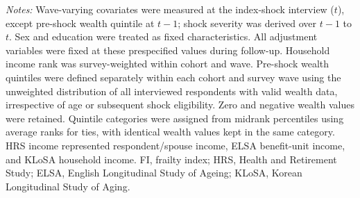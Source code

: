 \begin{landscape}
\vspace{0.25em}
\parbox{\linewidth}{\raggedright\fontsize{9}{11}\selectfont\textit{Notes:} Wave-varying covariates were measured at the index-shock interview ($t$), except pre-shock wealth quintile at $t-1$; shock severity was derived over $t-1$ to $t$. Sex and education were treated as fixed characteristics. All adjustment variables were fixed at these prespecified values during follow-up. Household income rank was survey-weighted within cohort and wave. Pre-shock wealth quintiles were defined separately within each cohort and survey wave using the unweighted distribution of all interviewed respondents with valid wealth data, irrespective of age or subsequent shock eligibility. Zero and negative wealth values were retained. Quintile categories were assigned from midrank percentiles using average ranks for ties, with identical wealth values kept in the same category. HRS income represented respondent/spouse income, ELSA benefit-unit income, and KLoSA household income. FI, frailty index; HRS, Health and Retirement Study; ELSA, English Longitudinal Study of Ageing; KLoSA, Korean Longitudinal Study of Aging.}
\end{landscape}
